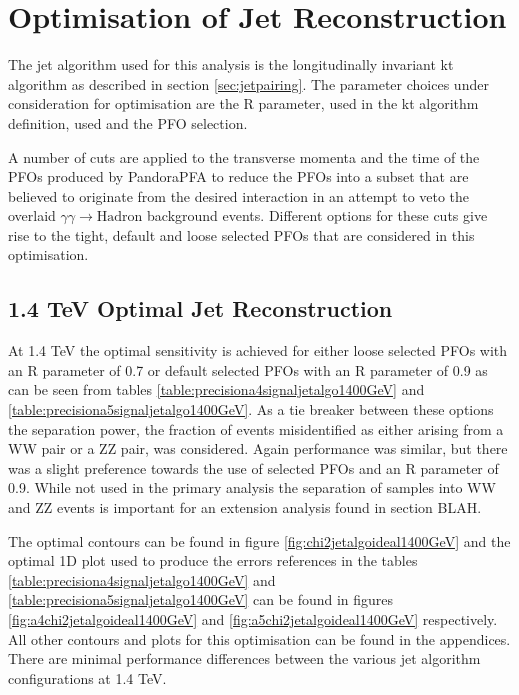 \section{Optimisation of Jet Reconstruction} \label{sec:optimisationjetalgo}
The jet algorithm used for this analysis is the longitudinally invariant kt algorithm as described in section \ref{sec:jetpairing}.  The parameter choices under consideration for optimisation are the R parameter, used in the kt algorithm definition, used and the PFO selection.  

A number of cuts \cite{arXiv:1209.4039} are applied to the transverse momenta and the time of the PFOs produced by PandoraPFA to reduce the PFOs into a subset that are believed to originate from the desired interaction in an attempt to veto the overlaid $\gamma\gamma \rightarrow \text{Hadron}$ background events.  Different options for these cuts  give rise to the tight, default and loose selected PFOs that are considered in this optimisation.  

\subsection{1.4 TeV Optimal Jet Reconstruction}
At 1.4 TeV the optimal sensitivity is achieved for either loose selected PFOs with an R parameter of 0.7 or default selected PFOs with an R parameter of 0.9 as can be seen from tables \ref{table:precisiona4signaljetalgo1400GeV} and \ref{table:precisiona5signaljetalgo1400GeV}.  As a tie breaker between these options the separation power, the fraction of events misidentified as either arising from a WW pair or a ZZ pair, was considered.  Again performance was similar, but there was a slight preference towards the use of selected PFOs and an R parameter of 0.9.  While not used in the primary analysis the separation of samples into WW and ZZ events is important for an extension analysis found in section BLAH.  

The optimal contours can be found in figure \ref{fig:chi2jetalgoideal1400GeV} and the optimal 1D plot used to produce the errors references in the tables \ref{table:precisiona4signaljetalgo1400GeV} and \ref{table:precisiona5signaljetalgo1400GeV} can be found in figures \ref{fig:a4chi2jetalgoideal1400GeV} and \ref{fig:a5chi2jetalgoideal1400GeV} respectively.  All other contours and plots for this optimisation can be found in the appendices.  There are minimal performance differences between the various jet algorithm configurations at 1.4 TeV.

